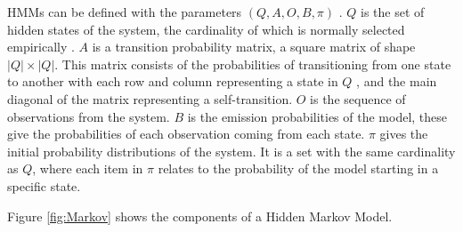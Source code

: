 \documentclass{article}
\begin{document}
HMMs can be defined with the parameters $(Q,A,O,B,\pi)$ \cite{jurafsky2018speech}.
$Q$ is the set of hidden states of the system, the cardinality of which is normally selected empirically \cite{ibe2013markov}.
$A$ is a transition probability matrix, a square matrix of shape $|Q|\times|Q|$.
This matrix consists of the probabilities of transitioning from one state to another with each row and column representing a state in $Q$
, and the main diagonal of the matrix representing a self-transition.
$O$ is the sequence of observations from the system.
$B$ is the emission probabilities of the model, these give the probabilities of each observation coming from each state.
$\pi$ gives the initial probability distributions of the system.
It is a set with the same cardinality as $Q$, where each item in $\pi$ relates to the probability of the model starting in a specific state.







Figure \ref{fig:Markov} shows the components of a Hidden Markov Model.

\end{document}
